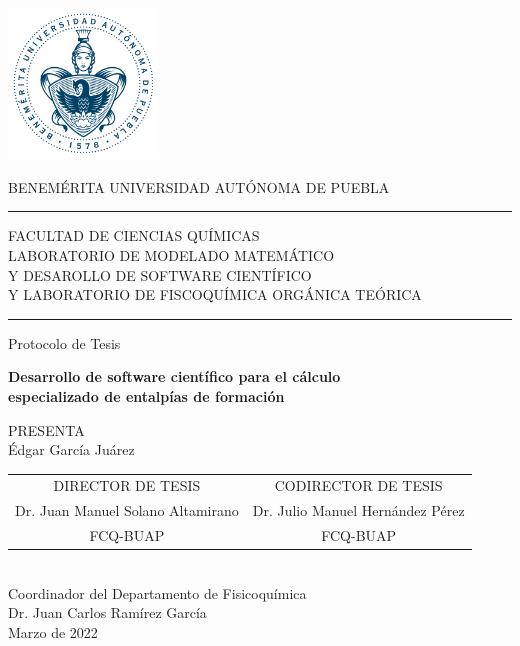 \documentclass[12pt]{article}
\newcommand\vtab[1][0.5cm]{\vspace*{#1}}
\begin{document}
\pagestyle{empty} 
\phantom{a}
\vspace{-1.4cm}
\begin{center}
\includegraphics[width=4cm]{Images/buap2014.png}

BENEMÉRITA UNIVERSIDAD AUTÓNOMA DE PUEBLA\\
\rule{150mm}{0.1mm}
\begin{small}
FACULTAD DE CIENCIAS QUÍMICAS\\
LABORATORIO DE MODELADO MATEMÁTICO\\
Y DESAROLLO DE SOFTWARE CIENTÍFICO\\
Y LABORATORIO DE FISCOQUÍMICA ORGÁNICA TEÓRICA\\
\end{small}
\rule{150mm}{0.1mm}

\vtab[.1cm]
\Large{Protocolo de Tesis}\\
\vtab[0.2cm]

\large{\textbf{Desarrollo de software científico para el cálculo\\
especializado de entalpías de formación}}\\
\vtab[0.2cm]

PRESENTA \\
Édgar García Juárez \\
\vtab[0.5cm]
\begin{tabular}{cc}
DIRECTOR DE TESIS & CODIRECTOR DE TESIS \\ 
Dr. Juan Manuel Solano Altamirano & Dr. Julio Manuel Hernández Pérez \\ 
FCQ-BUAP & FCQ-BUAP \\ 
\end{tabular} 
\vtab[0.7cm] \\
\large{Coordinador del Departamento de Fisicoquímica\\
Dr. Juan Carlos Ramírez García}\\
\vtab[0.2cm]
{\small Marzo de 2022}
\end{center}
\end{document}
